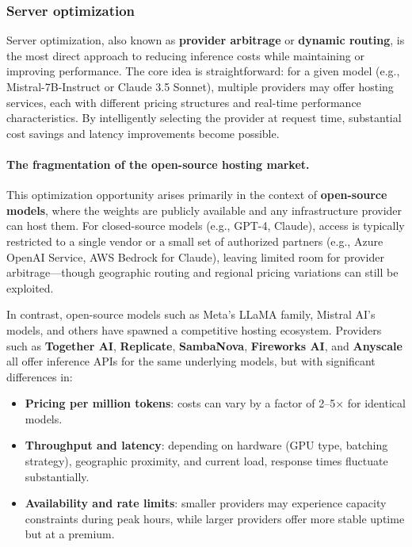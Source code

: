 \documentclass[english]{article}
\begin{document}
\subsubsection{Server optimization}

Server optimization, also known as \textbf{provider arbitrage} or \textbf{dynamic routing}, is the most direct approach to reducing inference costs while maintaining or improving performance. The core idea is straightforward: for a given model (e.g., Mistral-7B-Instruct or Claude 3.5 Sonnet), multiple providers may offer hosting services, each with different pricing structures and real-time performance characteristics. By intelligently selecting the provider at request time, substantial cost savings and latency improvements become possible.

\paragraph{The fragmentation of the open-source hosting market.}

This optimization opportunity arises primarily in the context of \textbf{open-source models}, where the weights are publicly available and any infrastructure provider can host them. For closed-source models (e.g., GPT-4, Claude), access is typically restricted to a single vendor or a small set of authorized partners (e.g., Azure OpenAI Service, AWS Bedrock for Claude), leaving limited room for provider arbitrage—though geographic routing and regional pricing variations can still be exploited.

In contrast, open-source models such as Meta's LLaMA family, Mistral AI's models, and others have spawned a competitive hosting ecosystem. Providers such as \textbf{Together AI}, \textbf{Replicate}, \textbf{SambaNova}, \textbf{Fireworks AI}, and \textbf{Anyscale} all offer inference APIs for the same underlying models, but with significant differences in:
\begin{itemize}
    \item \textbf{Pricing per million tokens}: costs can vary by a factor of 2--5× for identical models.
    \item \textbf{Throughput and latency}: depending on hardware (GPU type, batching strategy), geographic proximity, and current load, response times fluctuate substantially.
    \item \textbf{Availability and rate limits}: smaller providers may experience capacity constraints during peak hours, while larger providers offer more stable uptime but at a premium.
\end{itemize}
\end{document}
